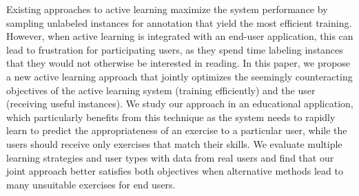 Existing approaches to active learning maximize the system performance by sampling unlabeled instances for annotation that yield the most efficient training. However, when active learning is integrated with an end-user application, this can lead to frustration for participating users, as they spend time labeling instances that they would not otherwise be interested in reading. In this paper, we propose a new active learning approach that jointly optimizes the seemingly counteracting objectives of the active learning system (training efficiently) and the user (receiving useful instances). We study our approach in an educational application, which particularly benefits from this technique as the system needs to rapidly learn to predict the appropriateness of an exercise to a particular user, while the users should receive only exercises that match their skills. We evaluate multiple learning strategies and user types with data from real users and find that our joint approach better satisfies both objectives when alternative methods lead to many unsuitable exercises for end users.
